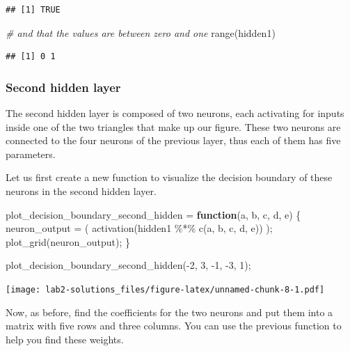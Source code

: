 \documentclass[
]{article}
\newenvironment{Shaded}{\begin{snugshade}}{\end{snugshade}}
\newcommand{\CommentTok}[1]{\textcolor[rgb]{0.56,0.35,0.01}{\textit{#1}}}
\newcommand{\ControlFlowTok}[1]{\textcolor[rgb]{0.13,0.29,0.53}{\textbf{#1}}}
\newcommand{\DecValTok}[1]{\textcolor[rgb]{0.00,0.00,0.81}{#1}}
\newcommand{\FunctionTok}[1]{\textcolor[rgb]{0.00,0.00,0.00}{#1}}
\newcommand{\NormalTok}[1]{#1}
\newcommand{\OtherTok}[1]{\textcolor[rgb]{0.56,0.35,0.01}{#1}}
\newcommand{\SpecialCharTok}[1]{\textcolor[rgb]{0.00,0.00,0.00}{#1}}
\begin{document}
\begin{verbatim}
## [1] TRUE
\end{verbatim}

\begin{Shaded}
\begin{Highlighting}[]
\CommentTok{\# and that the values are between zero and one}
\FunctionTok{range}\NormalTok{(hidden1)}
\end{Highlighting}
\end{Shaded}

\begin{verbatim}
## [1] 0 1
\end{verbatim}

\hypertarget{second-hidden-layer}{%
\subsubsection{Second hidden layer}\label{second-hidden-layer}}

The second hidden layer is composed of two neurons, each activating for
inputs inside one of the two triangles that make up our figure. These
two neurons are connected to the four neurons of the previous layer,
thus each of them has five parameters.

Let us first create a new function to visualize the decision boundary of
these neurons in the second hidden layer.

\begin{Shaded}
\begin{Highlighting}[]
\NormalTok{plot\_decision\_boundary\_second\_hidden }\OtherTok{=} \ControlFlowTok{function}\NormalTok{(a, b, c, d, e) \{}
\NormalTok{  neuron\_output }\OtherTok{=}\NormalTok{ (}
    \FunctionTok{activation}\NormalTok{(hidden1 }\SpecialCharTok{\%*\%} \FunctionTok{c}\NormalTok{(a, b, c, d, e))}
\NormalTok{  );}
  \FunctionTok{plot\_grid}\NormalTok{(neuron\_output);}
\NormalTok{\}}

\FunctionTok{plot\_decision\_boundary\_second\_hidden}\NormalTok{(}\SpecialCharTok{{-}}\DecValTok{2}\NormalTok{, }\DecValTok{3}\NormalTok{, }\SpecialCharTok{{-}}\DecValTok{1}\NormalTok{, }\SpecialCharTok{{-}}\DecValTok{3}\NormalTok{, }\DecValTok{1}\NormalTok{);}
\end{Highlighting}
\end{Shaded}

\texttt{[image: lab2-solutions\_files/figure-latex/unnamed-chunk-8-1.pdf]}

Now, as before, find the coefficients for the two neurons and put them
into a matrix with five rows and three columns. You can use the previous
function to help you find these weights.
\end{document}

